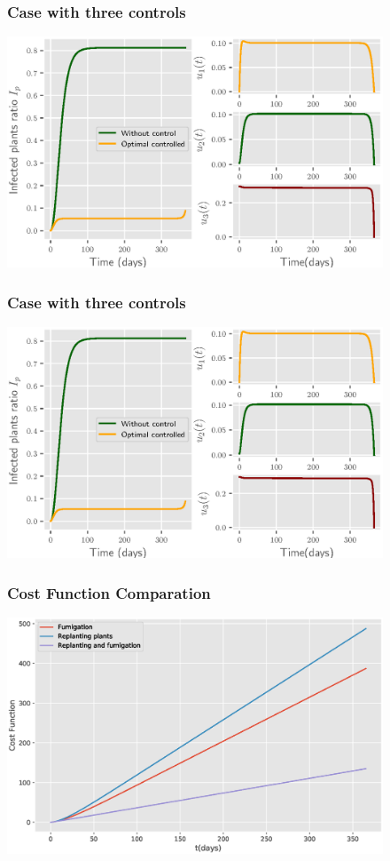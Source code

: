 	\begin{frame}
		\begin{figure}
			\frametitle{Case with three controls}
			\centering	
			\includegraphics[scale=0.5]{Feathergraphics/three_controls_simulation_1.eps}
		\end{figure}	
	\end{frame}
\begin{frame}
	\begin{figure}
		\frametitle{Case with three controls}
		\centering	
		\includegraphics[scale=0.5]{Feathergraphics/three_controls_simulation_1.eps}
	\end{figure}	
\end{frame}
\begin{frame}
	\begin{figure}
		\frametitle{Cost Function Comparation}
		\centering	
		\includegraphics[width=\linewidth]{Feathergraphics/Cost_Comparation.eps}
	\end{figure}	
\end{frame}